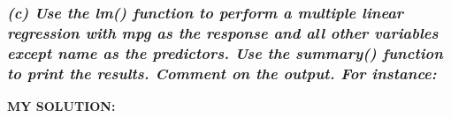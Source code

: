 \documentclass[
]{article}
\begin{document}
\hypertarget{c-use-the-lm-function-to-perform-a-multiple-linear-regression-with-mpg-as-the-response-and-all-other-variables-except-name-as-the-predictors.-use-the-summary-function-to-print-the-results.-comment-on-the-output.-for-instance}{%
\subsubsection{\texorpdfstring{\emph{(c) Use the lm() function to
perform a multiple linear regression with mpg as the response and all
other variables except name as the predictors. Use the summary()
function to print the results. Comment on the output. For
instance:}}{(c) Use the lm() function to perform a multiple linear regression with mpg as the response and all other variables except name as the predictors. Use the summary() function to print the results. Comment on the output. For instance:}}\label{c-use-the-lm-function-to-perform-a-multiple-linear-regression-with-mpg-as-the-response-and-all-other-variables-except-name-as-the-predictors.-use-the-summary-function-to-print-the-results.-comment-on-the-output.-for-instance}}

\textbf{MY SOLUTION:}
\end{document}
